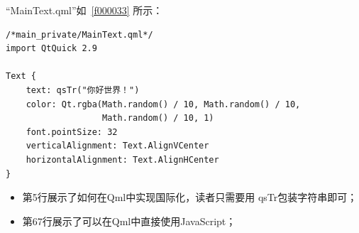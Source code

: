 “MainText.qml”如\lstlistingname\ \ref{f000033}
所示：

\FloatBarrier
\begin{lstlisting}[label=f000033,
caption=GoodLuck,
title=\lstlistingname\ \thelstlisting
]
/*main_private/MainText.qml*/
import QtQuick 2.9

Text {
    text: qsTr("你好世界！")
    color: Qt.rgba(Math.random() / 10, Math.random() / 10,
                   Math.random() / 10, 1)
    font.pointSize: 32
    verticalAlignment: Text.AlignVCenter
    horizontalAlignment: Text.AlignHCenter
}
\end{lstlisting}          %

\begin{itemize}

\item 第5行展示了如何在Qml中实现国际化，读者只需要用
qsTr包装字符串即可；
\item 第6\raisebox{0.16ex}{\sourcefonttwo\~{}}7行展示了可以在Qml中直接使用JavaScript；


\end{itemize}













